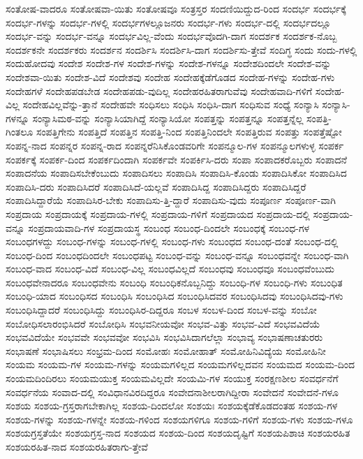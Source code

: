 {ಸಂತೋಷ-ವಾದರೂ
ಸಂತೋಷವಾ-ಯಿತು
ಸಂತೋಷವೂ
ಸಂತ್ರಸ್ತರ
ಸಂದಣಿಯಿದ್ದುದ-ರಿಂದ
ಸಂದರ್ಭ
ಸಂದರ್ಭಕ್ಕೆ
ಸಂದರ್ಭ-ಗಳನ್ನು
ಸಂದರ್ಭ-ಗಳಲ್ಲಿ
ಸಂದರ್ಭಗಳಲ್ಲೂಜನರು
ಸಂದರ್ಭ-ಗಳು
ಸಂದರ್ಭ-ದಲ್ಲಿ
ಸಂದರ್ಭದಲ್ಲೂ
ಸಂದರ್ಭ-ವನ್ನು
ಸಂದರ್ಭ-ವನ್ನೂ
ಸಂದರ್ಭವಿಲ್ಲ-ವೆಂದು
ಸಂದರ್ಭವೊದಗಿ-ದಾಗ
ಸಂದರ್ಶಕ
ಸಂದರ್ಶಕ-ನೊಬ್ಬ
ಸಂದರ್ಶಕನೇ
ಸಂದರ್ಶಕರು
ಸಂದರ್ಶನ
ಸಂದರ್ಶಿಸಿ
ಸಂದರ್ಶಿಸಿ-ದಾಗ
ಸಂದರ್ಶಿಸು-ತ್ತೇವೆ
ಸಂದಿಗ್ಧ
ಸಂದು
ಸಂದು-ಗಳಲ್ಲಿ
ಸಂದುಹೋದವು
ಸಂದೇಶ
ಸಂದೇಶ-ಗಳ
ಸಂದೇಶ-ಗಳನ್ನು
ಸಂದೇಶ-ಗಳನ್ನೂ
ಸಂದೇಶದಿಂದಲೇ
ಸಂದೇಶ-ವನ್ನು
ಸಂದೇಶವಾ-ಯಿತು
ಸಂದೇಶ-ವಿದೆ
ಸಂದೇಶವು
ಸಂದೇಹ
ಸಂದೇಹಕ್ಕೆಡೆಗೊಡದ
ಸಂದೇಹ-ಗಳನ್ನು
ಸಂದೇಹ-ಗಳು
ಸಂದೇಹಗಳೆ
ಸಂದೇಹಪಡಬೇಡ
ಸಂದೇಹಪಡು-ವುದಿಲ್ಲ
ಸಂದೇಹರಹಿತರಾಗುವೆವು
ಸಂದೇಹವಾದಿ-ಗಳಿಗೆ
ಸಂದೇಹ-ವಿಲ್ಲ
ಸಂದೇಹವಿಲ್ಲವೆನ್ನು-ತ್ತಾನೆ
ಸಂದೇಹವೇ
ಸಂಧಿಸಲು
ಸಂಧಿಸಿ
ಸಂಧಿಸಿ-ದಾಗ
ಸಂಧಿಸುವ
ಸಂಧ್ಯೆ
ಸಂನ್ಯಾಸಿ
ಸಂನ್ಯಾಸಿ-ಗಳನ್ನೂ
ಸಂನ್ಯಾಸಿಮಠ-ವನ್ನು
ಸಂನ್ಯಾಸಿಯಾಗಿದ್ದೆ
ಸಂನ್ಯಾಸಿಯೋ
ಸಂಪತ್ತನ್ನು
ಸಂಪತ್ತನ್ನೂ
ಸಂಪತ್ತನ್ನೆಲ್ಲ
ಸಂಪತ್ತಿ-ಗಿಂತಲೂ
ಸಂಪತ್ತಿಗೇನು
ಸಂಪತ್ತಿದೆ
ಸಂಪತ್ತಿನ
ಸಂಪತ್ತಿ-ನಿಂದ
ಸಂಪತ್ತಿನಿಂದಲೇ
ಸಂಪತ್ತಿರುವ
ಸಂಪತ್ತು
ಸಂಪತ್ತೆಷ್ಟೋ
ಸಂಪನ್ನ-ನಾದ
ಸಂಪನ್ನರ
ಸಂಪನ್ನ-ರಾದ
ಸಂಪನ್ನರೆನಿಸಿಕೊಂಡವರಿಗೇ
ಸಂಪನ್ಮೂಲ-ಗಳ
ಸಂಪನ್ಮೂಲಗಳುಳ್ಳ
ಸಂಪರ್ಕ
ಸಂಪರ್ಕಕ್ಕೆ
ಸಂಪರ್ಕ-ದಿಂದ
ಸಂಪರ್ಕದಿಂದಾಗಿ
ಸಂಪರ್ಕವೇ
ಸಂಪರ್ಕಿಸಿ-ದರು
ಸಂಪಾ
ಸಂಪಾದಕರೊಬ್ಬರು
ಸಂಪಾದನೆ
ಸಂಪಾದನೆಯ
ಸಂಪಾದಿಸಬೇಕೆಂಬುದು
ಸಂಪಾದಿಸಲು
ಸಂಪಾದಿಸಿ
ಸಂಪಾದಿಸಿ-ಕೊಂಡು
ಸಂಪಾದಿಸಿಕೋ
ಸಂಪಾದಿಸಿದ
ಸಂಪಾದಿಸಿ-ದರು
ಸಂಪಾದಿಸಿದರೆ
ಸಂಪಾದಿಸಿದೆ-ಯಲ್ಲವೆ
ಸಂಪಾದಿಸಿದ್ದ
ಸಂಪಾದಿಸಿದ್ದರು
ಸಂಪಾದಿಸಿದ್ದರೆ
ಸಂಪಾದಿಸಿದ್ದಾರೆಯೆ
ಸಂಪಾದಿಸಿರ-ಬೇಕು
ಸಂಪಾದಿಸು-ತ್ತಿ-ದ್ದಾರೆ
ಸಂಪಾದಿಸು-ವುದು
ಸಂಪೂರ್ಣ
ಸಂಪೂರ್ಣ-ವಾಗಿ
ಸಂಪ್ರದಾಯ
ಸಂಪ್ರದಾಯಕ್ಕೆ
ಸಂಪ್ರದಾಯ-ಗಳಲ್ಲಿ
ಸಂಪ್ರದಾಯ-ಗಳಿಗೆ
ಸಂಪ್ರದಾಯದ
ಸಂಪ್ರದಾಯ-ದಲ್ಲಿ
ಸಂಪ್ರದಾಯ-ವನ್ನೂ
ಸಂಪ್ರದಾಯವಾದಿ-ಗಳ
ಸಂಪ್ರದಾಯಸ್ಥ
ಸಂಬಂಧ
ಸಂಬಂಧ-ದಿಂದಲೇ
ಸಂಬಂಧಕ್ಕೆ
ಸಂಬಂಧ-ಗಳ
ಸಂಬಂಧಗಳದ್ದು
ಸಂಬಂಧ-ಗಳನ್ನು
ಸಂಬಂಧ-ಗಳಲ್ಲಿ
ಸಂಬಂಧ-ಗಳು
ಸಂಬಂಧದ
ಸಂಬಂಧ-ದಂತೆ
ಸಂಬಂಧ-ದಲ್ಲಿ
ಸಂಬಂಧ-ದಿಂದ
ಸಂಬಂಧದಿಂದಲೇ
ಸಂಬಂಧಪಟ್ಟ
ಸಂಬಂಧ-ವನ್ನು
ಸಂಬಂಧ-ವನ್ನೂ
ಸಂಬಂಧವನ್ನೇ
ಸಂಬಂಧ-ವಾಗಿ
ಸಂಬಂಧ-ವಾದ
ಸಂಬಂಧ-ವಿದೆ
ಸಂಬಂಧ-ವಿಲ್ಲ
ಸಂಬಂಧವಿಲ್ಲದೆ
ಸಂಬಂಧವು
ಸಂಬಂಧವೂ
ಸಂಬಂಧವೆಂಬುದು
ಸಂಬಂಧವೇನಾದರೂ
ಸಂಬಂಧವೇನು
ಸಂಬಂಧಿ
ಸಂಬಂಧಿಕನೊಬ್ಬನಿದ್ದು
ಸಂಬಂಧಿ-ಗಳ
ಸಂಬಂಧಿ-ಗಳು
ಸಂಬಂಧಿತ
ಸಂಬಂಧಿ-ಯಾದ
ಸಂಬಂಧಿಸದ
ಸಂಬಂಧಿಸಿ
ಸಂಬಂಧಿಸಿದ
ಸಂಬಂಧಿಸಿದವರ
ಸಂಬಂಧಿಸಿದವು
ಸಂಬಂಧಿಸಿದವು-ಗಳು
ಸಂಬಂಧಿಸಿದ್ದಾದರೆ
ಸಂಬಂಧಿಸಿದ್ದು
ಸಂಬಂಧಿಸಿರ-ದಿದ್ದರೂ
ಸಂಬಳ
ಸಂಬಳ-ದಿಂದ
ಸಂಬಳ-ವನ್ನು
ಸಂಬೋ
ಸಂಬೋಧಿಸಲಾರಂಭಿಸಿದರೆ
ಸಂಬೋಧಿಸಿ
ಸಂಭವನೀಯವೋ
ಸಂಭವ-ವಿತ್ತು
ಸಂಭವ-ವಿದೆ
ಸಂಭವವಿದೆಯೆ
ಸಂಭವವಿದೆಯೇ
ಸಂಭವವೇ
ಸಂಭವವೋ
ಸಂಭವಿಸಿ
ಸಂಭವಿಸಿದಾಗಲೆಲ್ಲಾ
ಸಂಭಾವ್ಯ
ಸಂಭಾಷಣಾಚತುರರು
ಸಂಭಾಷಣೆ
ಸಂಭಾಷಿಸಲು
ಸಂಭ್ರಮ-ದಿಂದ
ಸಂಮೋಹಃ
ಸಂಮೋಹಾತ್
ಸಂಮೋಹಿನಿವಿದ್ಯೆಯ
ಸಂಮೋಹಿನೀ
ಸಂಯಮ
ಸಂಯಮ-ಗಳ
ಸಂಯಮ-ಗಳನ್ನು
ಸಂಯಮಗಳಿಲ್ಲದ
ಸಂಯಮಗಳಿಲ್ಲದವನ
ಸಂಯಮದ
ಸಂಯಮ-ದಿಂದ
ಸಂಯಮದಿಂದಿರಲು
ಸಂಯಮಯುಕ್ತ
ಸಂಯಮವಿಲ್ಲದೇ
ಸಂಯಮಿ-ಗಳ
ಸಂಯುಕ್ತ
ಸಂರಕ್ಷಣಶೀಲ
ಸಂವರ್ಧನೆಗೆ
ಸಂವರ್ಧನೆಯ
ಸಂವಾದ-ದಲ್ಲಿ
ಸಂವಿಧಾನವಿರದಿದ್ದರೂ
ಸಂವೇದನಾಶೀಲರಾಗಿದ್ದೀರಾ
ಸಂವೇದನೆ
ಸಂವೇದನೆ-ಗಳೂ
ಸಂಶಯ
ಸಂಶಯ-ಗ್ರಸ್ತರಾಗಬೇಕಾಗಿಲ್ಲ
ಸಂಶಯ-ದಿಂದಲೋ
ಸಂಶಯಃ
ಸಂಶಯಕ್ಕೆಡೆಕೊಡದಂತಹ
ಸಂಶಯ-ಗಳ
ಸಂಶಯ-ಗಳನ್ನು
ಸಂಶಯ-ಗಳನ್ನೇ
ಸಂಶಯ-ಗಳಿಂದ
ಸಂಶಯಗಳಿಗೂ
ಸಂಶಯ-ಗಳಿಗೆ
ಸಂಶಯ-ಗಳು
ಸಂಶಯ-ಗಳೂ
ಸಂಶಯಗ್ರಸ್ತತೆಯೇ
ಸಂಶಯಗ್ರಸ್ತ-ನಾದ
ಸಂಶಯದ
ಸಂಶಯ-ದಿಂದ
ಸಂಶಯದೃಷ್ಟಿಗೆ
ಸಂಶಯಪಿಶಾಚಿ
ಸಂಶಯರಹಿತ
ಸಂಶಯರಹಿತ-ನಾದ
ಸಂಶಯರಹಿತರಾಗು-ತ್ತೇವೆ
}
